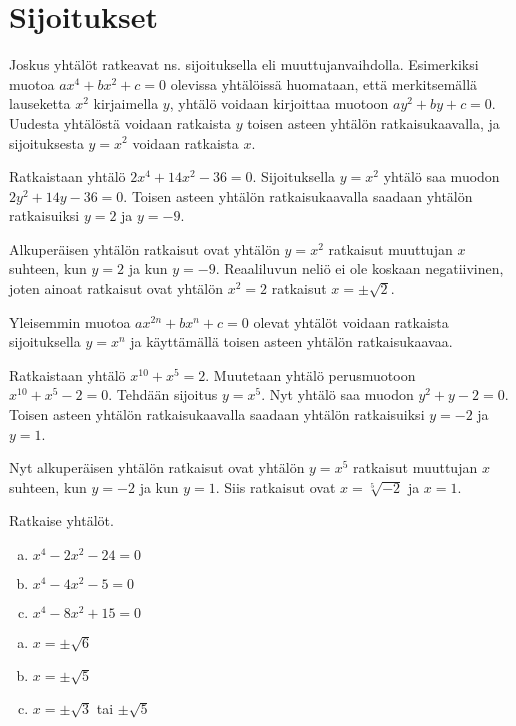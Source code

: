 \section*{Sijoitukset}
Joskus yhtälöt ratkeavat ns. sijoituksella eli muuttujanvaihdolla. Esimerkiksi muotoa $ax^4+bx^2+c=0$ olevissa yhtälöissä huomataan, että merkitsemällä
lauseketta $x^2$ kirjaimella $y$, yhtälö voidaan kirjoittaa muotoon $ay^2+by+c=0$. Uudesta yhtälöstä voidaan ratkaista $y$ toisen asteen yhtälön
ratkaisukaavalla, ja sijoituksesta $y = x^2$ voidaan ratkaista $x$.

\begin{esimerkki}
Ratkaistaan yhtälö $2x^4+14x^2-36=0$. Sijoituksella $y = x^2$ yhtälö saa muodon $2y^2+14y-36 = 0$. Toisen asteen yhtälön ratkaisukaavalla saadaan yhtälön ratkaisuiksi $y = 2$ ja $y = -9$.

Alkuperäisen yhtälön ratkaisut ovat yhtälön $y = x^2$ ratkaisut muuttujan $x$ suhteen, kun $y = 2$ ja kun $y = -9$. Reaaliluvun neliö ei ole koskaan
negatiivinen, joten ainoat ratkaisut ovat yhtälön $x^2 = 2$ ratkaisut $x = \pm\sqrt{2}$.
\end{esimerkki}

Yleisemmin muotoa $ax^{2n}+bx^n+c=0$ olevat yhtälöt voidaan ratkaista sijoituksella $y = x^n$ ja käyttämällä toisen asteen yhtälön ratkaisukaavaa.

\begin{esimerkki}
Ratkaistaan yhtälö $x^{10}+x^5=2$. Muutetaan yhtälö perusmuotoon $x^{10}+x^5-2=0$. Tehdään sijoitus $y = x^5$. Nyt yhtälö saa muodon $y^2+y-2 = 0$. Toisen asteen yhtälön ratkaisukaavalla saadaan yhtälön ratkaisuiksi $y = -2$ ja $y = 1$.

Nyt alkuperäisen yhtälön ratkaisut ovat yhtälön $y = x^5$ ratkaisut muuttujan $x$ suhteen, kun $y = -2$ ja kun $y = 1$. Siis ratkaisut ovat $x = \sqrt[5]{-2}$ ja $x = 1$.
\end{esimerkki}

\Harjoitustehtavat

\begin{tehtava}
    Ratkaise yhtälöt.
    \begin{enumerate}[a)]
        \item $x^4 - 2x^2 - 24 = 0$
        \item $x^4 - 4x^2 - 5 = 0$
        \item $x^4 - 8x^2 + 15 = 0$
    \end{enumerate}
    \begin{vastaus}
        \begin{enumerate}[a)]
            \item $x = \pm\sqrt{6}$
            \item $x = \pm\sqrt{5}$
            \item $x = \pm\sqrt{3}$ tai $\pm\sqrt{5}$
        \end{enumerate}
    \end{vastaus}
\end{tehtava}

